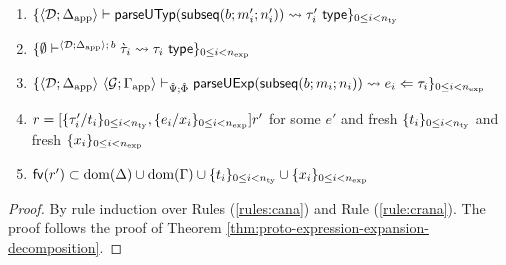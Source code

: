 \begin{lemma}
\begin{enumerate}
  \begin{enumerate}
    \item $\{
          \langle \mathcal{D}; \Delta_\text{app} \rangle \vdash 
            \mathsf{parseUTyp}(\mathsf{subseq}(b; m'_i; n'_i))
           \leadsto \tau'_i~\mathsf{type}
        \}_{0 \leq i < n_\text{ty}}$
    \item $\{
      \emptyset\vdash^{
        \langle \mathcal{D}; \Delta_\text{app} \rangle
          ;\,b
      } 
        \grave{\tau}_i
       \leadsto \tau_i~\mathsf{type}
    \}_{0 \leq i < n_\text{exp}}$
    \item $\{
      \langle \mathcal{D}; \Delta_\text{app} \rangle~\langle \mathcal{G}; \Gamma_\text{app} \rangle \vdash_{\hat{\Psi}; \hat\Phi} \mathsf{parseUExp}(\mathsf{subseq}(b; m_i; n_i)) \leadsto e_i \Leftarrow \tau_i
    \}_{0 \leq i < n_\text{exp}}$
    \item $r = [\{\tau'_i/t_i\}_{0 \leq i < n_\text{ty}}, \{e_i/x_i\}_{0 \leq i < n_\text{exp}}]r'$ for some $e'$ and fresh $\{t_i\}_{0 \leq i < n_\text{ty}}$ and fresh $\{x_i\}_{0 \leq i < n_\text{exp}}$ 
    \item $\mathsf{fv}(r') \subset \text{dom}(\Delta) \cup \text{dom}(\Gamma) \cup \{t_i\}_{0 \leq i < n_\text{ty}} \cup \{x_i\}_{0 \leq i < n_\text{exp}}$
  \end{enumerate}
\end{enumerate}
\end{lemma}
\begin{proof} By rule induction over Rules (\ref{rules:cana}) and Rule (\ref{rule:crana}). The proof follows the proof of Theorem \ref{thm:proto-expression-expansion-decomposition}. 
\end{proof}

